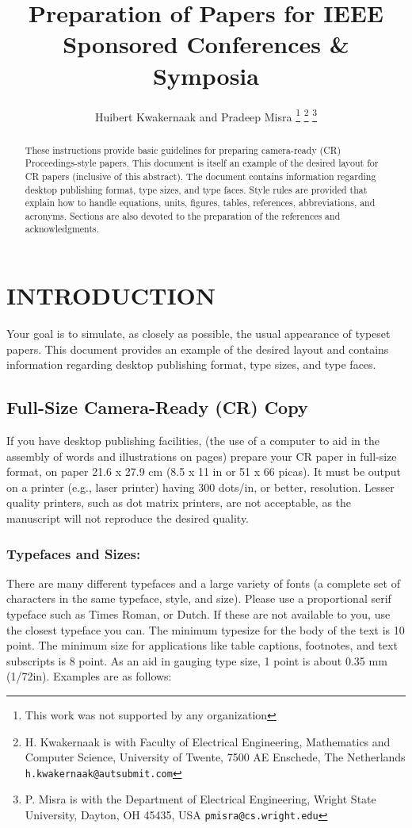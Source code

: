 \documentclass[a4paper, 10pt, conference]{ieeeconf}      %
\title{\LARGE \bf
Preparation of Papers for IEEE Sponsored Conferences \& Symposia
}
\author{Huibert Kwakernaak and Pradeep Misra%
\thanks{This work was not supported by any organization}%
\thanks{H. Kwakernaak is with Faculty of Electrical Engineering, Mathematics and Computer Science,
        University of Twente, 7500 AE Enschede, The Netherlands
        {\tt\small h.kwakernaak@autsubmit.com}}%
\thanks{P. Misra is with the Department of Electrical Engineering, Wright State University,
        Dayton, OH 45435, USA
        {\tt\small pmisra@cs.wright.edu}}%
}
\begin{document}
\maketitle
\thispagestyle{empty}
\pagestyle{empty}


\begin{abstract}

These instructions provide basic guidelines for preparing camera-ready (CR)
Proceedings-style papers. This document is itself an example of the
desired layout for CR papers (inclusive of this abstract). The document
contains information regarding desktop publishing format, type sizes, and
type faces. Style rules are provided that explain how to handle equations,
units, figures, tables, references, abbreviations, and acronyms. Sections
are also devoted to the preparation of the references and acknowledgments.

\end{abstract}


\section{INTRODUCTION}

Your goal is to simulate, as closely as possible, the usual appearance of typeset
 papers. This document provides an example of the desired layout and contains
 information regarding desktop publishing format, type sizes, and type faces.

\subsection{Full-Size Camera-Ready (CR) Copy}

If you have desktop publishing facilities, (the use of a computer to aid
 in the assembly of words and illustrations on pages) prepare your CR paper
  in full-size format, on paper 21.6 x 27.9 cm (8.5 x 11 in or 51 x 66 picas).
  It must be output on a printer (e.g., laser printer) having 300 dots/in, or
  better, resolution. Lesser quality printers, such as dot matrix printers,
   are not acceptable, as the manuscript will not reproduce the desired quality.

\subsubsection{Typefaces and Sizes:} There are many different typefaces and a large
variety of fonts (a complete set of characters in the same typeface, style,
 and size). Please use a proportional serif typeface such as Times Roman,
 or Dutch. If these are not available to you, use the closest typeface you
  can. The minimum typesize for the body of the text is 10 point. The minimum
  size for applications like table captions, footnotes, and text subscripts
  is 8 point. As an aid in gauging type size, 1 point is about 0.35 mm (1/72in).
   Examples are as follows:
\end{document}

